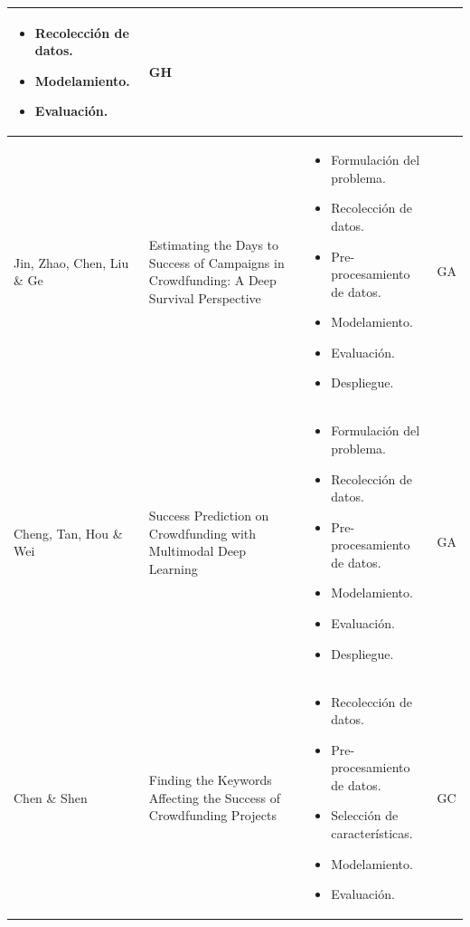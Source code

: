 \begin{longtable}{M{3cm}M{5.5cm}M{5.5cm}M{1.5cm}}
\begin{itemize}[label={--},nosep,noitemsep,leftmargin=*,topsep=0pt,partopsep=0pt]
				\item Recolección de datos.
				\item Modelamiento.
				\item Evaluación.
			\end{itemize}
			& GH
			\\
			\hline
			Jin, Zhao, Chen, Liu \& Ge
			& Estimating the Days to Success of Campaigns in Crowdfunding: A Deep Survival Perspective
			& 
			\begin{itemize}[label={--},nosep,noitemsep,leftmargin=*,topsep=0pt,partopsep=0pt]
				\item Formulación del problema.
				\item Recolección de datos.
				\item Pre-procesamiento de datos.
				\item Modelamiento.
				\item Evaluación.
				\item Despliegue.
			\end{itemize}
			& GA
			\\
			\hline
			Cheng, Tan, Hou \& Wei
			& Success Prediction on Crowdfunding with Multimodal Deep Learning
			& 
			\begin{itemize}[label={--},nosep,noitemsep,leftmargin=*,topsep=0pt,partopsep=0pt]
				\item Formulación del problema.
				\item Recolección de datos.
				\item Pre-procesamiento de datos.
				\item Modelamiento.
				\item Evaluación.
				\item Despliegue.
			\end{itemize}
			& GA
			\\
			\hline
			Chen \& Shen
			& Finding the Keywords Affecting the Success of Crowdfunding Projects
			& 
			\begin{itemize}[label={--},nosep,noitemsep,leftmargin=*,topsep=0pt,partopsep=0pt]
				\item Recolección de datos.
				\item Pre-procesamiento de datos.
				\item Selección de características.
				\item Modelamiento.
				\item Evaluación.
			\end{itemize}
			& GC
			\\

\end{longtable}
